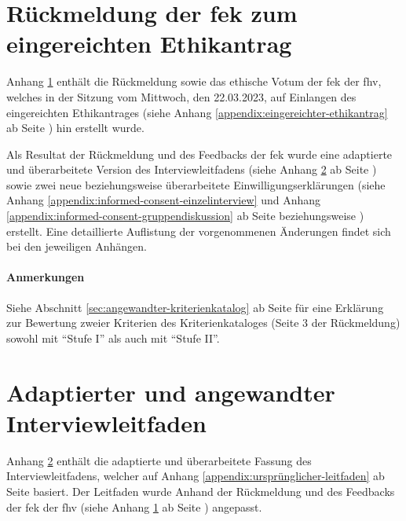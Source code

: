 \documentclass[a4paper,12pt,twoside]{scrreprt}
\begin{document}
\chapter{Rückmeldung der \acl{fek} zum eingereichten Ethikantrag}
\label{appendix:rückmeldung-fek}

Anhang \ref{appendix:rückmeldung-fek} enthält die Rückmeldung sowie das ethische Votum der \acl{fek} der \acl{fhv}, welches in der Sitzung vom Mittwoch, den 22.03.2023, auf Einlangen des eingereichten Ethikantrages (siehe Anhang \ref{appendix:eingereichter-ethikantrag} ab Seite \pageref{appendix:eingereichter-ethikantrag}) hin erstellt wurde.

\medskip

Als Resultat der Rückmeldung und des Feedbacks der \ac{fek} wurde eine adaptierte und überarbeitete Version des Interviewleitfadens (siehe Anhang \ref{appendix:interview-leitfaden} ab Seite \pageref{appendix:interview-leitfaden}) sowie zwei neue beziehungsweise überarbeitete Einwilligungserklärungen (siehe Anhang \ref{appendix:informed-consent-einzelinterview} und Anhang \ref{appendix:informed-consent-gruppendiskussion} ab Seite \pageref{appendix:informed-consent-einzelinterview} beziehungsweise \pageref{appendix:informed-consent-gruppendiskussion}) erstellt. Eine detaillierte Auflistung der vorgenommenen Änderungen findet sich bei den jeweiligen Anhängen.

\subsubsection*{Anmerkungen}
\label{appendix:anmerkungen-rückmeldung-fek}

Siehe Abschnitt \ref{sec:angewandter-kriterienkatalog} ab Seite \pageref{sec:angewandter-kriterienkatalog} für eine Erklärung zur Bewertung zweier Kriterien des Kriterienkataloges (Seite 3 der Rückmeldung) sowohl mit \enquote{Stufe I} als auch mit \enquote{Stufe II}.



\cleardoublepage
\chapter{Adaptierter und angewandter Interviewleitfaden}
\label{appendix:interview-leitfaden}

Anhang \ref{appendix:interview-leitfaden} enthält die adaptierte und überarbeitete Fassung des Interviewleitfadens, welcher auf Anhang \ref{appendix:ursprünglicher-leitfaden} ab Seite \pageref{appendix:ursprünglicher-leitfaden} basiert. Der Leitfaden wurde Anhand der Rückmeldung und des Feedbacks der \acl{fek} der \acl{fhv} (siehe Anhang \ref{appendix:rückmeldung-fek} ab Seite \pageref{appendix:rückmeldung-fek}) angepasst.
\end{document}

